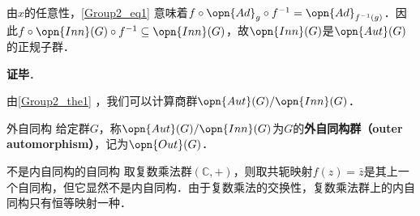 由$x$的任意性，\autoref{Group2_eq1} 意味着$f\circ \opn{Ad}_g\circ f^{-1}=\opn{Ad}_{f^{-1}(g)}$．因此$f\circ\opn{Inn}(G)\circ f^{-1}\subseteq\opn{Inn}(G)$，故$\opn{Inn}(G)$是$\opn{Aut}(G)$的正规子群．

\textbf{证毕}．

由\autoref{Group2_the1} ，我们可以计算商群$\opn{Aut}(G)/\opn{Inn}(G)$．

\begin{definition}{外自同构}
给定群$G$，称$\opn{Aut}(G)/\opn{Inn}(G)$为$G$的\textbf{外自同构群（outer automorphism）}，记为$\opn{Out} (G)$．
\end{definition}

\begin{example}{不是内自同构的自同构}
取复数乘法群$(\mathbb{C}, +)$，则取共轭映射$f(z)=\bar{z}$是其上一个自同构，但它显然不是内自同构．由于复数乘法的交换性，复数乘法群上的内自同构只有恒等映射一种．
\end{example}














